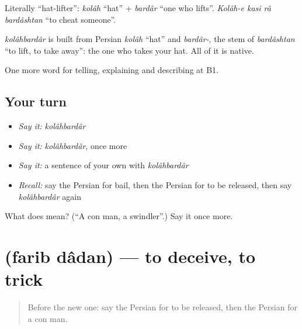 Literally \textquotedblleft{}hat-lifter\textquotedblright{}: \emph{kolâh} \textquotedblleft{}hat\textquotedblright{} + \emph{bardâr} \textquotedblleft{}one who lifts\textquotedblright{}. \emph{Kolâh-e kasi râ bardâshtan} \textquotedblleft{}to cheat someone\textquotedblright{}.

\begin{cousinweb}
\emph{kolâhbardâr} is built from Persian \emph{kolâh} \textquotedblleft{}hat\textquotedblright{} and \emph{bardâr-}, the stem of \emph{bardâshtan} \textquotedblleft{}to lift, to take away\textquotedblright{}: the one who takes your hat. All of it is native.
\end{cousinweb}

\begin{grammarlens}[title={What you've built}]
One more word for telling, explaining and describing at B1.
\end{grammarlens}

\subsection*{Your turn}
\begin{itemize}
\raggedright
  \item \emph{Say it:} \emph{kolâhbardâr}
  \item \emph{Say it:} \emph{kolâhbardâr}, once more
  \item \emph{Say it:} a sentence of your own with \emph{kolâhbardâr}
  \item \emph{Recall:} say the Persian for bail, then the Persian for to be released, then say \emph{kolâhbardâr} again
\end{itemize}

\begin{tcolorbox}[breakable,colback=teal!4,colframe=teal!35!black,title={Before you move on}]
What does  mean? (\textquotedblleft{}A con man, a swindler\textquotedblright{}.) Say it once more.
\end{tcolorbox}
\section[\texorpdfstring{\fa{فریب} \fa{دادن} (farib dâdan)}{فریب دادن (farib dâdan)}]{  (farib dâdan) — to deceive, to trick}

\label{lesson:FA-C323-farib-dadan}



\begin{quote}
Before the new one: say the Persian for to be released, then the Persian for a con man.
\end{quote}

